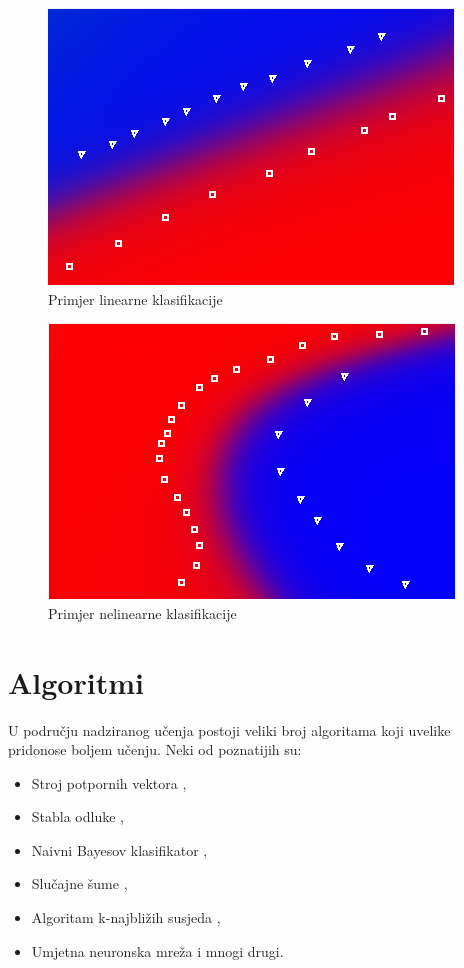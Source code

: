 \documentclass[times, utf8, zavrsni]{fer}
\begin{document}
\begin{figure}[H]
    \centering
    \includegraphics[scale=0.8]{img/linear-classification.png}
    \caption[Caption for LOF]{Primjer linearne klasifikacije\footnotemark}
    \label{fig:linear-classification}
\end{figure}

\begin{figure}[H]
    \centering
    \includegraphics[scale=0.8]{img/non-linear-classification.png}
    \caption[Caption for LOF]{Primjer nelinearne klasifikacije\footnotemark}
    \label{fig:non-linear-classification}
\end{figure}

\section{Algoritmi}
U području nadziranog učenja postoji veliki broj algoritama koji uvelike pridonose boljem učenju. Neki od poznatijih su:

\begin{itemize}
    \item Stroj potpornih vektora ,
    \item Stabla odluke ,
    \item Naivni Bayesov klasifikator ,
    \item Slučajne šume ,
    \item Algoritam k-najbližih susjeda ,
    \item Umjetna neuronska mreža  i mnogi drugi.
\end{itemize}
\end{document}
